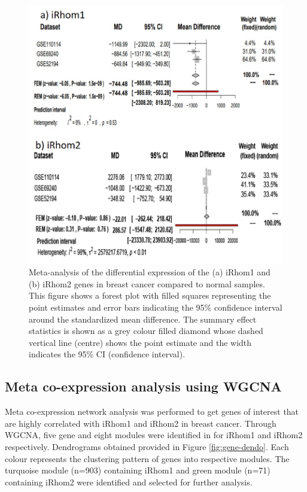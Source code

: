 \documentclass[fleqn,10pt,lineno]{wlpeerj}
\begin{document}
\begin{figure}[ht]
\centering
\includegraphics[width=\linewidth]{forest-plot.jpg}
\caption{Meta-analysis of the differential expression of the (a) iRhom1 and (b) iRhom2 genes in breast cancer compared to normal samples. This figure shows a forest plot with filled squares representing the point estimates and error bars indicating the 95\% confidence interval around the standardized mean difference. The summary effect statistics is shown as a grey colour filled diamond whose dashed vertical line (centre) shows the point estimate and the width indicates the 95\% CI (confidence interval).}
\label{fig:forest-plot}
\end{figure}


\subsection*{Meta co-expression analysis using WGCNA}
Meta co-expression network analysis was performed to get genes of interest that are highly correlated with iRhom1 and iRhom2 in breast cancer. Through WGCNA, five gene and eight modules were identified in for iRhom1 and iRhom2 respectively. Dendrograms obtained provided in Figure \ref{fig:gene-dendo}. Each colour represents the clustering pattern of genes into respective modules. The turquoise module (n=903) containing iRhom1 and green module (n=71) containing iRhom2 were identified and selected for further analysis.
\end{document}

